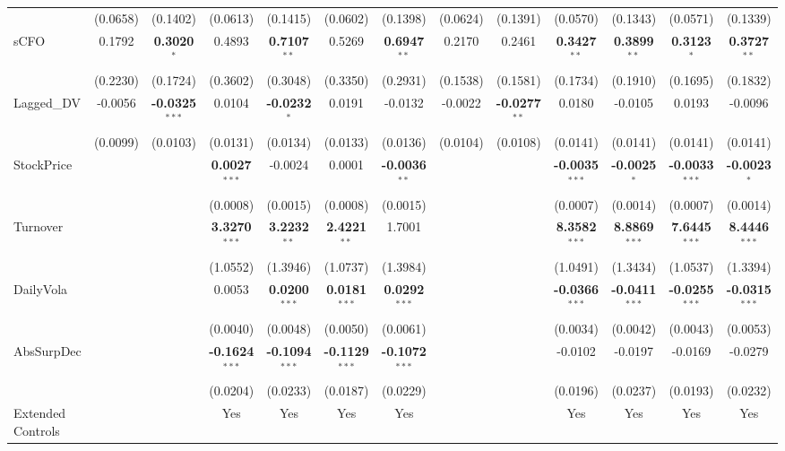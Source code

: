 \documentclass[11pt,a4paper]{article}
\begin{document}
\begin{table}[htbp]
\begin{tabular}{lcccccccccccc}
 & (0.0658) & (0.1402) & (0.0613) & (0.1415) & (0.0602) & (0.1398) & (0.0624) & (0.1391) & (0.0570) & (0.1343) & (0.0571) & (0.1339) \\
sCFO & 0.1792 & \textbf{0.3020}$^{*}$ & 0.4893 & \textbf{0.7107}$^{**}$ & 0.5269 & \textbf{0.6947}$^{**}$ & 0.2170 & 0.2461 & \textbf{0.3427}$^{**}$ & \textbf{0.3899}$^{**}$ & \textbf{0.3123}$^{*}$ & \textbf{0.3727}$^{**}$ \\
 & (0.2230) & (0.1724) & (0.3602) & (0.3048) & (0.3350) & (0.2931) & (0.1538) & (0.1581) & (0.1734) & (0.1910) & (0.1695) & (0.1832) \\
Lagged\_DV & -0.0056 & \textbf{-0.0325}$^{***}$ & 0.0104 & \textbf{-0.0232}$^{*}$ & 0.0191 & -0.0132 & -0.0022 & \textbf{-0.0277}$^{**}$ & 0.0180 & -0.0105 & 0.0193 & -0.0096 \\
 & (0.0099) & (0.0103) & (0.0131) & (0.0134) & (0.0133) & (0.0136) & (0.0104) & (0.0108) & (0.0141) & (0.0141) & (0.0141) & (0.0141) \\
StockPrice &  &  & \textbf{0.0027}$^{***}$ & -0.0024 & 0.0001 & \textbf{-0.0036}$^{**}$ &  &  & \textbf{-0.0035}$^{***}$ & \textbf{-0.0025}$^{*}$ & \textbf{-0.0033}$^{***}$ & \textbf{-0.0023}$^{*}$ \\
 &  &  & (0.0008) & (0.0015) & (0.0008) & (0.0015) &  &  & (0.0007) & (0.0014) & (0.0007) & (0.0014) \\
Turnover &  &  & \textbf{3.3270}$^{***}$ & \textbf{3.2232}$^{**}$ & \textbf{2.4221}$^{**}$ & 1.7001 &  &  & \textbf{8.3582}$^{***}$ & \textbf{8.8869}$^{***}$ & \textbf{7.6445}$^{***}$ & \textbf{8.4446}$^{***}$ \\
 &  &  & (1.0552) & (1.3946) & (1.0737) & (1.3984) &  &  & (1.0491) & (1.3434) & (1.0537) & (1.3394) \\
DailyVola &  &  & 0.0053 & \textbf{0.0200}$^{***}$ & \textbf{0.0181}$^{***}$ & \textbf{0.0292}$^{***}$ &  &  & \textbf{-0.0366}$^{***}$ & \textbf{-0.0411}$^{***}$ & \textbf{-0.0255}$^{***}$ & \textbf{-0.0315}$^{***}$ \\
 &  &  & (0.0040) & (0.0048) & (0.0050) & (0.0061) &  &  & (0.0034) & (0.0042) & (0.0043) & (0.0053) \\
AbsSurpDec &  &  & \textbf{-0.1624}$^{***}$ & \textbf{-0.1094}$^{***}$ & \textbf{-0.1129}$^{***}$ & \textbf{-0.1072}$^{***}$ &  &  & -0.0102 & -0.0197 & -0.0169 & -0.0279 \\
 &  &  & (0.0204) & (0.0233) & (0.0187) & (0.0229) &  &  & (0.0196) & (0.0237) & (0.0193) & (0.0232) \\
\midrule
Extended Controls &  &  & Yes & Yes & Yes & Yes &  &  & Yes & Yes & Yes & Yes \\

\end{tabular}
\end{table}
\end{document}
